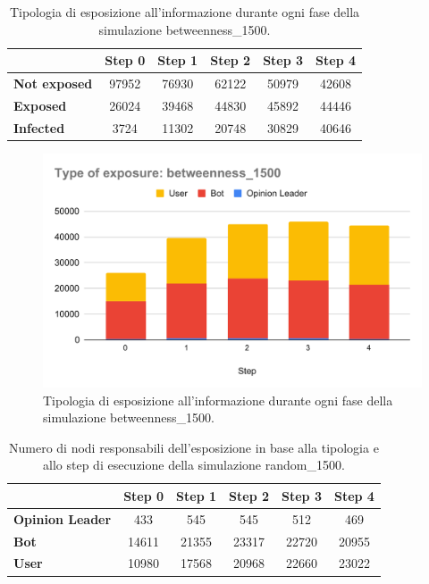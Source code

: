             
        \begin{table}[H]
            \centering
            \begin{tabular}{l|c|c|c|c|c}
                        & Step 0 & Step 1 & Step 2 & Step 3 & Step 4 \\ \hline
            \textbf{Not exposed} & 97952  & 76930  & 62122  & 50979  & 42608  \\ \hline
            \textbf{Exposed}     & 26024  & 39468  & 44830  & 45892  & 44446  \\ \hline
            \textbf{Infected}    & 3724   & 11302  & 20748  & 30829  & 40646  \\
            \end{tabular}
            \caption{Tipologia di esposizione all'informazione durante ogni fase della simulazione betweenness\_1500.}
        \end{table}
        
        \begin{figure}[H]
            \centering
            \includegraphics[width=.7\textwidth]{resources/charts/Type of exposure_ betweenness_1500.pdf}
            \caption{Tipologia di esposizione all'informazione durante ogni fase della simulazione betweenness\_1500.}
        \end{figure}
        
        \begin{table}[H]
            \centering
            \begin{tabular}{l|c|c|c|c|c}
                           & Step 0 & Step 1 & Step 2 & Step 3 & Step 4 \\ \hline
            \textbf{Opinion Leader} & 433    & 545    & 545    & 512    & 469    \\ \hline
            \textbf{Bot}            & 14611  & 21355  & 23317  & 22720  & 20955  \\ \hline
            \textbf{User}           & 10980  & 17568  & 20968  & 22660  & 23022  \\
            \end{tabular}
                \caption{Numero di nodi responsabili dell'esposizione in base alla tipologia e allo step di esecuzione della simulazione random\_1500.}
        \end{table}
        
